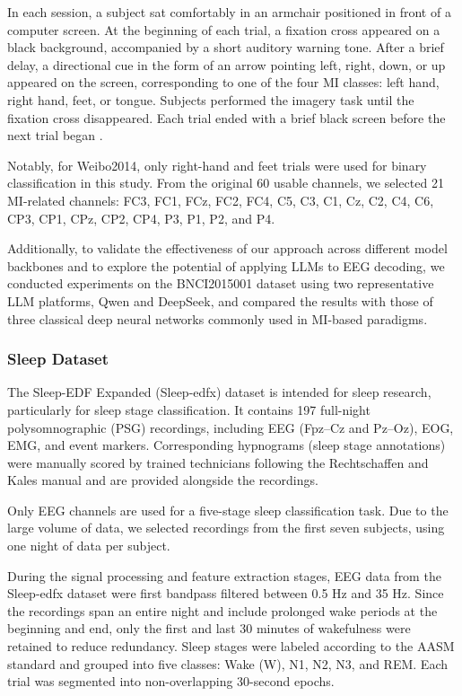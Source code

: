 \documentclass[journal,twocolumn]{IEEEtran}
\begin{document}
In each session, a subject sat comfortably in an armchair positioned in front of a computer screen. At the beginning of each trial, a fixation cross appeared on a black background, accompanied by a short auditory warning tone. After a brief delay, a directional cue in the form of an arrow pointing left, right, down, or up appeared on the screen, corresponding to one of the four MI classes: left hand, right hand, feet, or tongue. Subjects performed the imagery task until the fixation cross disappeared. Each trial ended with a brief black screen before the next trial began \cite{tangermann2012review}.

Notably, for Weibo2014, only right-hand and feet trials were used for binary classification in this study. From the original 60 usable channels, we selected 21 MI-related channels: FC3, FC1, FCz, FC2, FC4, C5, C3, C1, Cz, C2, C4, C6, CP3, CP1, CPz, CP2, CP4, P3, P1, P2, and P4.

Additionally, to validate the effectiveness of our approach across different model backbones and to explore the potential of applying LLMs to EEG decoding, we conducted experiments on the BNCI2015001 dataset using two representative LLM platforms, Qwen and DeepSeek, and compared the results with those of three classical deep neural networks commonly used in MI-based paradigms.

\subsubsection{Sleep Dataset}
The Sleep-EDF Expanded (Sleep-edfx) dataset is intended for sleep research, particularly for sleep stage classification. It contains 197 full-night polysomnographic (PSG) recordings, including EEG (Fpz–Cz and Pz–Oz), EOG, EMG, and event markers. Corresponding hypnograms (sleep stage annotations) were manually scored by trained technicians following the Rechtschaffen and Kales manual and are provided alongside the recordings.

Only EEG channels are used for a five-stage sleep classification task. Due to the large volume of data, we selected recordings from the first seven subjects, using one night of data per subject.

During the signal processing and feature extraction stages, EEG data from the Sleep-edfx dataset were first bandpass filtered between 0.5 Hz and 35 Hz. Since the recordings span an entire night and include prolonged wake periods at the beginning and end, only the first and last 30 minutes of wakefulness were retained to reduce redundancy. Sleep stages were labeled according to the AASM standard and grouped into five classes: Wake (W), N1, N2, N3, and REM. Each trial was segmented into non-overlapping 30-second epochs.
\end{document}

